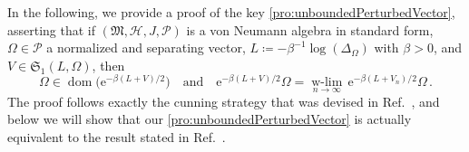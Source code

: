 \documentclass[a4paper, twoside, 11pt, reqno]{amsart}
\theoremstyle{definition}
\theoremstyle{plain}
\renewcommand{\Delta}{\varDelta}
\renewcommand{\Omega}{\varOmega}
\newcommand{\MH}{\mathcal{H}}
\newcommand{\MFM}{\mathfrak{M}}
\newcommand{\MFS}{\mathfrak{S}}
\newcommand{\ee}{\mathrm{e}}
\newcommand{\NPC}{\mathcal{P}}
\newcommand{\1}{\mathbf{1}}
\newcommand{\dlim}[2]{\operatorname*{\text{$#1$}-lim}_{#2}\,}
\DeclareMathOperator{\dom}{dom}
\newcommand{\ce}{\coloneqq}
\newcommand{\inv}[1]{#1^{-1}}
\newcommand{\tand}{\quad\text{and}\quad}
\begin{document}
In the following, we provide a proof of the key \cref{pro:unboundedPerturbedVector}, asserting that if $(\MFM, \MH, J, \NPC)$ is a von Neumann algebra in standard form, $\Omega \in \NPC$ a normalized and separating vector, $L \ce - \inv{\beta} \log(\Delta_\Omega)$ with $\beta > 0$, and $V \in \MFS_1(L, \Omega)$, then
\begin{equation*}
    \Omega \in \dom \bigl(\ee^{- \beta (L + V) / 2}\bigr) \tand \ee^{- \beta (L + V) / 2} \Omega = \dlim{w}{n \to \infty} \ee^{- \beta (L + V_n) / 2} \Omega \, .
\end{equation*}
The proof follows exactly the cunning strategy that was devised in Ref.~\cite[Thm. 5.1 (1)]{DJP03}, and below we will show that our \cref{pro:unboundedPerturbedVector} is actually equivalent to the result stated in Ref.~\cite[Thm. 5.5 (1)]{DJP03}.
\end{document}
